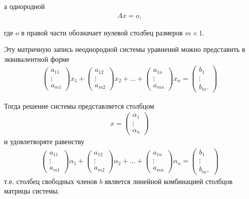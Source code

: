 \documentclass[%
	11pt,
	a4paper,
	utf8,
		]{article}
\begin{document}
\vspace*{-3mm}
а однородной
\vspace*{-3mm}
\begin{align*}
	A x = o,
\end{align*}

\vspace*{-3mm}
где $ o $ в правой части обозначает нулевой столбец размеров $ m \times 1 $.

Эту матричную запись неоднородной системы уравнений можно представить в эквивалентной форме
\begin{align*}
	\begin{pmatrix}
		a_{11} \\
		\vdots \\
		a_{m1}
	\end{pmatrix} x_1 + 
    \begin{pmatrix}
    	a_{12} \\
    	\vdots \\
    	a_{m2}
    \end{pmatrix} x_2 + \ldots +
    \begin{pmatrix}
    	a_{1n} \\
    	\vdots \\
    	a_{mn}
    \end{pmatrix} x_n = 
    \begin{pmatrix}
    	b_1 \\
    	\vdots \\
    	b_m.
    \end{pmatrix}
\end{align*}

Тогда решение системы представляется столбцом
\begin{align*}
	x =
	\begin{pmatrix}
		\alpha_1 \\
		\vdots \\
		\alpha_n
	\end{pmatrix}
\end{align*}
и удовлетворяте равенству
\begin{align*}
	\begin{pmatrix}
		a_{11} \\
		\vdots \\
		a_{m1}
	\end{pmatrix} \alpha_1 +
    \begin{pmatrix}
    	a_{12} \\
    	\vdots \\
    	a_{m2}
    \end{pmatrix} \alpha_2 + \ldots + 
    \begin{pmatrix}
    	a_{1n} \\
    	\vdots \\
    	a_{mn}
    \end{pmatrix} \alpha_n =
    \begin{pmatrix}
    	b_1 \\
    	\vdots \\
    	b_m,
    \end{pmatrix}
\end{align*}
т.е. столбец свободных членов $ b $ является линейной комбинацией столбцов матрицы системы.
\end{document}
